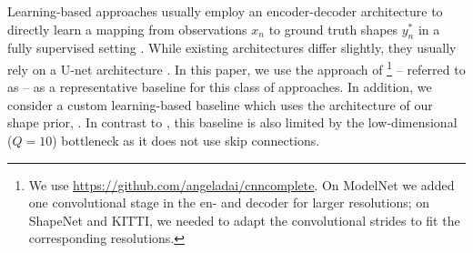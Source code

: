 %
Learning-based approaches usually employ an encoder-decoder architecture to directly learn a mapping from observations $x_n$ to ground truth shapes $y_n^*$ in a fully supervised setting \citep{Wang2017ICCV,Varley2017IROS,Yang2018ARXIVb,Yang2017ARXIV,Dai2017CVPRa}. While existing architectures differ slightly, they usually rely on a U-net architecture \citep{Ronneberger2015MICCAI,Cicek2016ARXIV}. In this paper, we use the approach of \cite{Dai2017CVPRa}\footnote{
    We use \url{https://github.com/angeladai/cnncomplete}. On ModelNet we added one convolutional stage in the en- and decoder for larger resolutions; on ShapeNet and KITTI, we needed to adapt the convolutional strides to fit the corresponding resolutions.
} -- referred to as \Dai\xspace --
as a representative baseline for this class of approaches. In addition, we consider a custom learning-based baseline which uses the architecture of our \DVAE shape prior, \cf {}. In contrast to \citep{Dai2017CVPRa}, this baseline is also limited by the low-dimensional ($Q = 10$) bottleneck as it does not use skip connections.